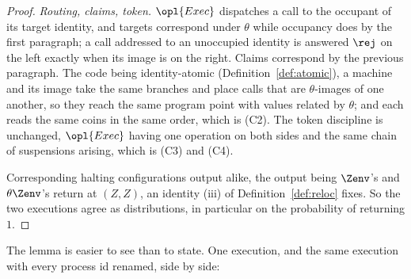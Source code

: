 \documentclass[10pt,oneside,openany]{book}
\theoremstyle{accentdef}
\theoremstyle{accentplain}
\begin{document}
\begin{proof}
\emph{Routing, claims, token.} $\opl{Exec}$ dispatches a call to the occupant of its target
identity, and targets correspond under $\theta$ while occupancy does by the first paragraph; a call
addressed to an unoccupied identity is answered $\rej$ on the left exactly when its image is on the
right. Claims correspond by the previous paragraph. The code being identity-atomic
(Definition~\ref{def:atomic}), a machine and its image take the same branches and place calls that
are $\theta$-images of one another, so they reach the same program point with values related by
$\theta$; and each reads the same coins in the same order, which is (C2). The
token discipline is unchanged, $\opl{Exec}$ having one operation on both sides and the same chain of
suspensions arising, which is (C3) and (C4).

Corresponding halting configurations output alike, the output being $\Zenv$'s and
$\theta\Zenv$'s return at $(Z,Z)$, an identity (iii) of Definition~\ref{def:reloc} fixes. So the two
executions agree as distributions, in particular on the probability of returning $1$.
\end{proof}

The lemma is easier to see than to state. One execution, and the same execution with every process
id renamed, side by side:
\end{document}

